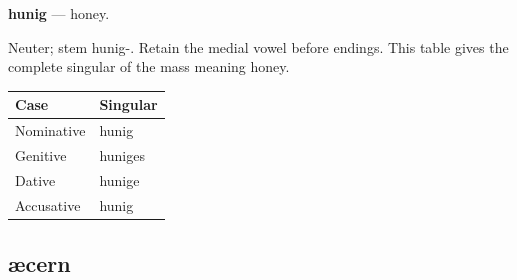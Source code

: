 \par\begin{minipage}{\linewidth}\raggedright
\textbf{hunig} — honey.

Neuter; stem hunig-. Retain the medial vowel before endings. This table gives the complete singular of the mass meaning honey.

\par\begingroup
\fontsize{10.5}{13.2}\selectfont
\setlength{\LTleft}{0pt}\setlength{\LTright}{\fill}
\noindent
\begin{tabular}{@{}>{\raggedright\arraybackslash}p{60.59mm}>{\raggedright\arraybackslash}p{60.59mm}@{}}
\toprule
\textbf{Case} & \textbf{Singular} \\
\midrule
Nominative & hunig \\
Genitive & huniges \\
Dative & hunige \\
Accusative & hunig \\
\bottomrule
\end{tabular}
\par\endgroup

\end{minipage}\par
{}
\subsection*{æcern}

